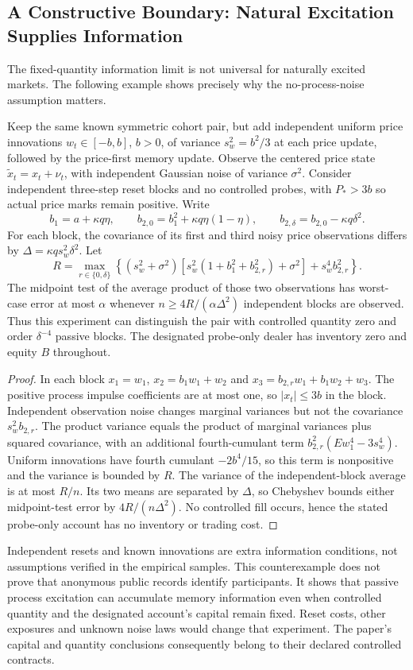 \subsection{A Constructive Boundary: Natural Excitation Supplies Information}
\label{sec:natural_excitation}
The fixed-quantity information limit is not universal for naturally excited markets. The following example shows precisely why the no-process-noise assumption matters.

\begin{proposition}
\label{prop:passive_excitation}
Keep the same known symmetric cohort pair, but add independent uniform price innovations $w_t\in[-b,b]$, $b>0$, of variance $s_w^2=b^2/3$ at each price update, followed by the price-first memory update. Observe the centered price state $\tilde x_t=x_t+\nu_t$, with independent Gaussian noise of variance $\sigma^2$. Consider independent three-step reset blocks and no controlled probes, with $P_*>3b$ so actual price marks remain positive. Write
\[
b_1=a+\kappa q\eta,\qquad
b_{2,0}=b_1^2+\kappa q\eta(1-\eta),\qquad
b_{2,\delta}=b_{2,0}-\kappa q\delta^2.
\]
For each block, the covariance of its first and third noisy price observations differs by $\Delta=\kappa q s_w^2\delta^2$. Let
\[
R=\max_{r\in\{0,\delta\}}
\left\{(s_w^2+\sigma^2)
[s_w^2(1+b_1^2+b_{2,r}^2)+\sigma^2]
+s_w^4 b_{2,r}^2\right\}.
\]
The midpoint test of the average product of those two observations has worst-case error at most $\alpha$ whenever $n\ge4R/(\alpha\Delta^2)$ independent blocks are observed. Thus this experiment can distinguish the pair with controlled quantity zero and order $\delta^{-4}$ passive blocks. The designated probe-only dealer has inventory zero and equity $B$ throughout.
\end{proposition}
\begin{proof}
In each block $x_1=w_1$, $x_2=b_1w_1+w_2$ and $x_3=b_{2,r}w_1+b_1w_2+w_3$. The positive process impulse coefficients are at most one, so $|x_t|\le3b$ in the block. Independent observation noise changes marginal variances but not the covariance $s_w^2b_{2,r}$. The product variance equals the product of marginal variances plus squared covariance, with an additional fourth-cumulant term $b_{2,r}^2(Ew_1^4-3s_w^4)$. Uniform innovations have fourth cumulant $-2b^4/15$, so this term is nonpositive and the variance is bounded by $R$. The variance of the independent-block average is at most $R/n$. Its two means are separated by $\Delta$, so Chebyshev bounds either midpoint-test error by $4R/(n\Delta^2)$. No controlled fill occurs, hence the stated probe-only account has no inventory or trading cost.
\end{proof}

Independent resets and known innovations are extra information conditions, not assumptions verified in the empirical samples. This counterexample does not prove that anonymous public records identify participants. It shows that passive process excitation can accumulate memory information even when controlled quantity and the designated account's capital remain fixed. Reset costs, other exposures and unknown noise laws would change that experiment. The paper's capital and quantity conclusions consequently belong to their declared controlled contracts.
